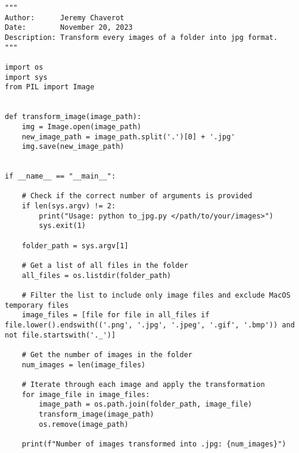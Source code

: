 \bigskip

\begin{lstlisting}[style=pythonstyle, label=lst:2, caption=Python script \texttt{to\_jpg.py} to transform every images of a specified folder into \texttt{jpg} format.]
"""
Author:      Jeremy Chaverot
Date:        November 20, 2023
Description: Transform every images of a folder into jpg format.
"""

import os
import sys
from PIL import Image


def transform_image(image_path):
    img = Image.open(image_path)
    new_image_path = image_path.split('.')[0] + '.jpg'
    img.save(new_image_path)


if __name__ == "__main__":

	# Check if the correct number of arguments is provided
    if len(sys.argv) != 2:
        print("Usage: python to_jpg.py </path/to/your/images>")
        sys.exit(1)

    folder_path = sys.argv[1]

    # Get a list of all files in the folder
    all_files = os.listdir(folder_path)
    
    # Filter the list to include only image files and exclude MacOS temporary files
    image_files = [file for file in all_files if file.lower().endswith(('.png', '.jpg', '.jpeg', '.gif', '.bmp')) and not file.startswith('._')]
    
    # Get the number of images in the folder
    num_images = len(image_files)

    # Iterate through each image and apply the transformation
    for image_file in image_files:
        image_path = os.path.join(folder_path, image_file)
        transform_image(image_path)
        os.remove(image_path)

    print(f"Number of images transformed into .jpg: {num_images}")
\end{lstlisting}


\bigskip

